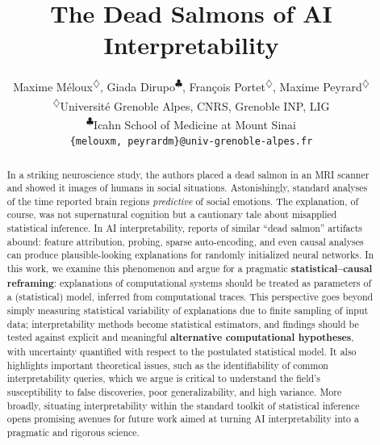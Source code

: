\documentclass{article} %
\title{
The Dead Salmons of AI Interpretability 
}
\author{
        Maxime Méloux\textsuperscript{$\diamondsuit$},\quad 
        Giada Dirupo\textsuperscript{$\clubsuit$},\quad 
        François Portet\textsuperscript{$\diamondsuit$},\quad 
        Maxime Peyrard\textsuperscript{$\diamondsuit$} \\[6pt]
        \normalfont
        \textsuperscript{$\diamondsuit$}Université Grenoble Alpes, CNRS, Grenoble INP, LIG \\ 
        \normalfont
        \textsuperscript{$\clubsuit$}Icahn School of Medicine at Mount Sinai \\[4pt]
        \normalfont
        \texttt{\{melouxm, peyrardm\}@univ-grenoble-alpes.fr}
}
\begin{document}
\maketitle

\begin{abstract}
In a striking neuroscience study, the authors placed a dead salmon in an MRI scanner and showed it images of humans in social situations. Astonishingly, standard analyses of the time reported brain regions \textit{predictive} of social emotions. The explanation, of course, was not supernatural cognition but a cautionary tale about misapplied statistical inference.
In AI interpretability, reports of similar ``dead salmon'' artifacts abound: feature attribution, probing, sparse auto-encoding, and even causal analyses can produce plausible-looking explanations for randomly initialized neural networks. 
In this work, we examine this phenomenon and argue for a pragmatic \textbf{statistical--causal reframing}: explanations of computational systems should be treated as parameters of a (statistical) model, inferred from computational traces. This perspective goes beyond simply measuring statistical variability of explanations due to finite sampling of input data; interpretability methods become statistical estimators, and findings should be tested against explicit and meaningful \textbf{alternative computational hypotheses}, with uncertainty quantified with respect to the postulated statistical model. It also highlights important theoretical issues, such as the identifiability of common interpretability queries, which we argue is critical to understand the field’s susceptibility to false discoveries, poor generalizability, and high variance. More broadly, situating interpretability within the standard toolkit of statistical inference opens promising avenues for future work aimed at turning AI interpretability into a pragmatic and rigorous science.

\end{abstract}
\end{document}
